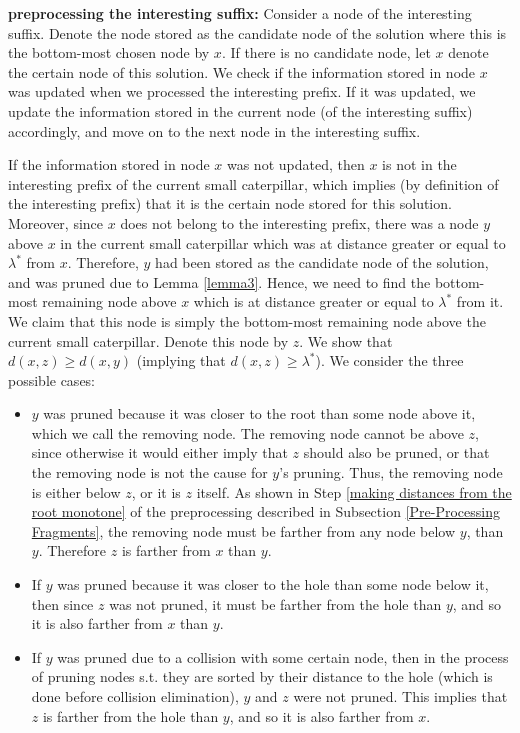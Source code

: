\documentclass[11pt,a4paper]{article}
\newcounter{mycounter}
\newenvironment{noindlist}
 {\begin{list}{\arabic{mycounter}.~~}{\usecounter{mycounter} \labelsep=0em \labelwidth=0em \leftmargin=0em \itemindent=0em}}
 {\end{list}}
\theoremstyle{definition}
\theoremstyle{remark}
\begin{document}
\begin{noindlist}
\item \textbf{preprocessing the interesting suffix:}
Consider a node of the interesting suffix. Denote the node stored as the candidate node of the solution where this is the bottom-most chosen node by $x$. If there is no candidate node, let $x$ denote the certain node of this solution.
We check if the information stored in node $x$ was updated when we processed the interesting prefix. If it was updated, we update the information stored in the current node (of the interesting suffix) accordingly, and move on to the next node in the interesting suffix. 

If the information stored in node $x$ was not updated, then $x$ is not in the interesting prefix of the current small caterpillar, which implies (by definition of the interesting prefix) that it is the certain node stored for this solution. Moreover, since $x$ does not belong to the interesting prefix, there was a node $y$ above $x$ in the current small caterpillar which was at distance greater or equal to $\lambda^*$ from $x$. Therefore, $y$ had been stored as the candidate node of the solution, and was pruned due to Lemma \ref{lemma3}. Hence, we need to find the bottom-most remaining node above $x$ which is at distance greater or equal to $\lambda^*$ from it. We claim that this node is simply the bottom-most remaining node above the current small caterpillar. Denote this node by $z$. We show that $d(x,z) \ge d(x,y)$ (implying that $d(x,z) \ge \lambda^*$).
We consider the three possible cases:
\begin{itemize}
\item $y$ was pruned because it was closer to the root than some node above it, which we call the removing node. The removing node cannot be above $z$, since otherwise it would either imply that $z$ should also be pruned, or that the removing node is not the cause for $y$'s pruning.
Thus, the removing node is either below $z$, or it is $z$ itself. As shown in Step \ref{making distances from the root monotone} of the preprocessing described in Subsection \ref{Pre-Processing Fragments}, the removing node must be farther from any node below $y$, than $y$. Therefore $z$ is farther from $x$ than $y$.

\item If $y$ was pruned because it was closer to the hole than some node below it, then since $z$ was not pruned, it must be farther from the hole than $y$, and so it is also farther from $x$ than $y$.
\item If $y$ was pruned due to a collision with some certain node, then in the process of pruning nodes s.t. they are sorted by their distance to the hole (which is done before collision elimination), $y$ and $z$ were not pruned. This implies that $z$ is farther from the hole than $y$, and so it is also farther from $x$.


\end{itemize}
\end{noindlist}
\end{document}
